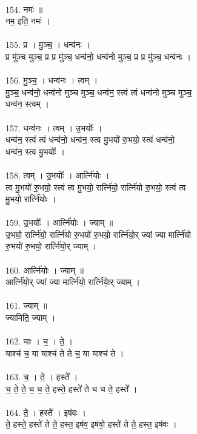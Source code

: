 \\
154. नमः॑ ॥\\
नम॒ इति॒ नमः॑ ।\\
\\
155. प्र । मु॒ञ्च॒ । धन्व॑नः ।\\
प्र मु॑ञ्च मुञ्च॒ प्र प्र मु॑ञ्च॒ धन्व॑नो॒ धन्व॑नो मुञ्च॒ प्र प्र मु॑ञ्च॒ धन्व॑नः ।\\
\\
156. मु॒ञ्च॒ । धन्व॑नः । त्वम् ।\\
मु॒ञ्च॒ धन्व॑नो॒ धन्व॑नो मुञ्च मुञ्च॒ धन्व॑न॒ स्त्वं त्वं धन्व॑नो मुञ्च मुञ्च॒\\
धन्व॑न॒ स्त्वम् ।\\
\\
157. धन्व॑नः । त्वम् । उ॒भयोः᳚ ।\\
धन्व॑न॒ स्त्वं त्वं धन्व॑नो॒ धन्व॑न॒ स्त्व मु॒भयो॑ रु॒भयो॒ स्त्वं धन्व॑नो॒\\
धन्व॑न॒ स्त्व मु॒भयोः᳚ ।\\
\\
158. त्वम् । उ॒भयोः᳚ । आर्त्नि॑योः ।\\
त्व मु॒भयो॑ रु॒भयो॒ स्त्वं त्व मु॒भयो॒ रार्त्नि॑यो॒ रार्त्नि॑यो रु॒भयो॒ स्त्वं त्व\\
मु॒भयो॒ रार्त्नि॑योः ।\\
\\
159. उ॒भयोः᳚ । आर्त्नि॑योः । ज्याम् ॥\\
उ॒भयो॒ रार्त्नि॑यो॒ रार्त्नि॑यो रु॒भयो॑ रु॒भयो॒ रार्त्नि॑यो॒र् ज्यां ज्या मार्त्नि॑यो\\
रु॒भयो॑ रु॒भयो॒ रार्त्नि॑यो॒र् ज्याम् ।\\
\\
160. आर्त्नि॑योः । ज्याम् ॥\\
आर्त्नि॑यो॒र् ज्यां ज्या मार्त्नि॑यो॒ रार्त्नि॑याे॒र् ज्याम् ।\\
\\
161. ज्याम् ॥\\
ज्यामिति॒ ज्याम् ।\\
\\
162. याः । च॒ । ते॒ ।\\
याश्च॑ च॒ या याश्च॑ ते ते च॒ या याश्च॑ ते ।\\
\\
163. च॒ । ते॒ । हस्ते᳚ ।\\
च॒ ते॒ ते॒ च॒ च॒ ते॒ हस्ते॒ हस्ते॑ ते च च ते॒ हस्ते᳚ ।\\
\\
164. ते॒ । हस्ते᳚ । इष॑वः ।\\
ते॒ हस्ते॒ हस्ते॑ ते ते॒ हस्त॒ इष॑व॒ इष॑वो॒ हस्ते॑ ते ते॒ हस्त॒ इष॑वः ।\\
